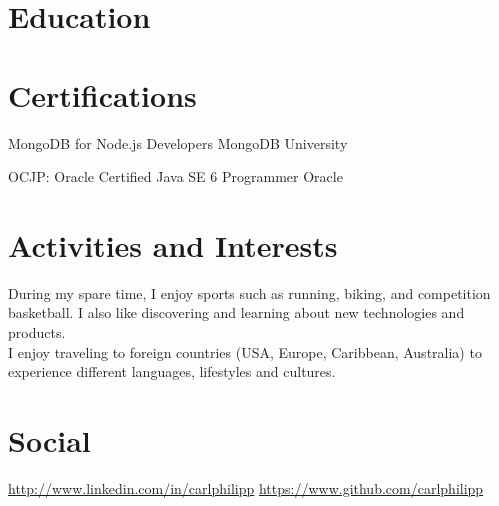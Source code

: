 \documentclass[12pt,a4paper]{moderncv}
\begin{document}
\section{Education}

\section{Certifications}

		{MongoDB for Node.js Developers}
		{MongoDB University}
		{}
		{}
		{}

		{OCJP: Oracle Certified Java SE 6 Programmer}
		{Oracle}
		{}
		{}
		{}

\section{Activities and Interests}
During my spare time, I enjoy sports such as running, biking, and competition basketball. I also like
discovering and learning about new technologies and products.\\
I enjoy traveling to foreign countries (USA, Europe, Caribbean, Australia) to experience different
languages, lifestyles and cultures.

\section{Social}
		{\href{http://www.linkedin.com/in/carlphilipp}{http://www.linkedin.com/in/carlphilipp}}
		{}
		{}
		{}
		{}
		{\href{https://www.github.com/carlphilipp}{https://www.github.com/carlphilipp}}
		{}
		{}
		{}
		{}
\end{document}
